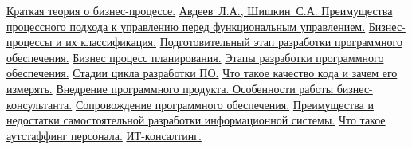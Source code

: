 \documentclass{../industrial-development}
\begin{document}
\begin{thebibliography}{99}
 \href{http://www.businessstudio.com.ua/bp/bpshort.php}{Краткая теория о бизнес-процессе.}
 \href{http://jurnal.org/articles/2015/ekon123.html}{Авдеев~Л.А., Шишкин~С.А. Преимущества процессного подхода к управлению перед функциональным управлением.}
 \href{http://vseproip.com/biznes-ip/maluy/klassifikaciya-biznes-processov.html}{Бизнес-процессы и их классификация.}
 \href{https://habr.com/post/256915/}{Подготовительный этап разработки программного обеспечения.}
 \href{http://center-yf.ru/data/Marketologu/Biznes-process-planirovaniya.php}{Бизнес процесс планирования.}
 \href{http://ab-solut.net/ru/articles/etapi_po/}{Этапы разработки программного обеспечения.}
 \href{https://qalight.com.ua/baza-znaniy/stadii-tsikla-razrabotki-po/}{Стадии цикла разработки ПО.}
 \href{https://habr.com/post/205342/}{Что такое качество кода и зачем его измерять.}
 \href{https://habr.com/company/trinion/blog/242747/}{Внедрение программного продукта. Особенности работы бизнес-консультанта.}
 \href{https://ru.wikipedia.org/wiki/Сопровождение_программного_обеспечения}{Сопровождение программного обеспечения.}
 \href{https://lektsii.com/2-40143.html}{Преимущества и недостатки самостоятельной разработки информационной системы.}
 \href{https://delatdelo.com/spravochnik/terminy/chto-takoe-autstaffing-personala.html}{Что такое аутстаффинг персонала.}
 \href{https://ru.wikipedia.org/wiki/ИТ-консалтинг}{ИТ-консалтинг.}
\end{thebibliography}
\end{document}
